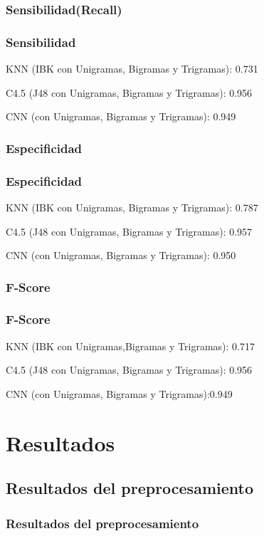 \documentclass{beamer}
\begin{document}
\subsubsection{Sensibilidad(Recall)}
\begin{frame}
\frametitle{Sensibilidad}
\item KNN (IBK con Unigramas, Bigramas y Trigramas): 0.731
\item C4.5 (J48 con Unigramas, Bigramas y Trigramas): 0.956
\item CNN (con Unigramas, Bigramas y Trigramas): 0.949 
\end{frame}
\subsubsection{Especificidad}
\begin{frame}
\frametitle{Especificidad}
\item KNN (IBK con Unigramas, Bigramas y Trigramas): 0.787
\item C4.5 (J48 con Unigramas, Bigramas y Trigramas): 0.957
\item CNN (con Unigramas, Bigramas y Trigramas): 0.950
\end{frame}
\subsubsection{F-Score}
\begin{frame}
\frametitle{F-Score}
\item KNN (IBK con Unigramas,Bigramas y Trigramas): 0.717
\item C4.5 (J48 con Unigramas, Bigramas y Trigramas): 0.956
\item CNN (con Unigramas, Bigramas y Trigramas):0.949
\end{frame}



\section{Resultados}


\subsection{Resultados del preprocesamiento}
\begin{frame}
\frametitle{Resultados del preprocesamiento}
\end{frame}
\end{document}
